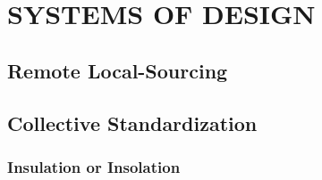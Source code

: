 \section{SYSTEMS OF DESIGN}

\subsection{Remote Local-Sourcing}



\subsection{Collective Standardization}

\subsubsection{Insulation or Insolation}
